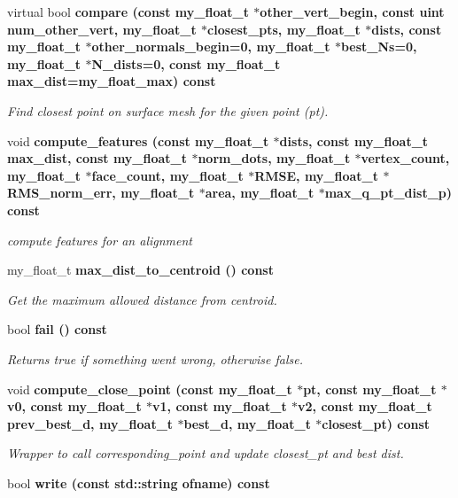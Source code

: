 \begin{CompactItemize}
\item 
virtual bool \bf{compare} (const my\_\-float\_\-t $\ast$other\_\-vert\_\-begin, const uint num\_\-other\_\-vert, my\_\-float\_\-t $\ast$closest\_\-pts, my\_\-float\_\-t $\ast$dists, const my\_\-float\_\-t $\ast$other\_\-normals\_\-begin=0, my\_\-float\_\-t $\ast$best\_\-Ns=0, my\_\-float\_\-t $\ast$N\_\-dists=0, const my\_\-float\_\-t max\_\-dist=my\_\-float\_\-max) const 
\begin{CompactList}\small\item\em Find closest point on surface mesh for the given point (pt). \item\end{CompactList}\item 
void \bf{compute\_\-features} (const my\_\-float\_\-t $\ast$dists, const my\_\-float\_\-t max\_\-dist, const my\_\-float\_\-t $\ast$norm\_\-dots, my\_\-float\_\-t $\ast$vertex\_\-count, my\_\-float\_\-t $\ast$face\_\-count, my\_\-float\_\-t $\ast$RMSE, my\_\-float\_\-t $\ast$RMS\_\-norm\_\-err, my\_\-float\_\-t $\ast$area, my\_\-float\_\-t $\ast$max\_\-q\_\-pt\_\-dist\_\-p) const 
\begin{CompactList}\small\item\em compute features for an alignment \item\end{CompactList}\item 
my\_\-float\_\-t \bf{max\_\-dist\_\-to\_\-centroid} () const \label{classSimSite3D_1_1geometry_1_1SimpleTrimeshTwo_84a7994256c468de4923e4cb062582b7}

\begin{CompactList}\small\item\em Get the maximum allowed distance from centroid. \item\end{CompactList}\item 
bool \bf{fail} () const \label{classSimSite3D_1_1geometry_1_1SimpleTrimeshTwo_b72565f595d0855f744b944d3f7eaf5b}

\begin{CompactList}\small\item\em Returns true if something went wrong, otherwise false. \item\end{CompactList}\item 
void \bf{compute\_\-close\_\-point} (const my\_\-float\_\-t $\ast$pt, const my\_\-float\_\-t $\ast$v0, const my\_\-float\_\-t $\ast$v1, const my\_\-float\_\-t $\ast$v2, const my\_\-float\_\-t prev\_\-best\_\-d, my\_\-float\_\-t $\ast$best\_\-d, my\_\-float\_\-t $\ast$closest\_\-pt) const 
\begin{CompactList}\small\item\em Wrapper to call corresponding\_\-point and update closest\_\-pt and best dist. \item\end{CompactList}\item 
bool \bf{write} (const std::string ofname) const \label{classSimSite3D_1_1geometry_1_1SimpleTrimeshTwo_4d86adb16d5464d99550bb826db10d51}


\end{CompactItemize}

